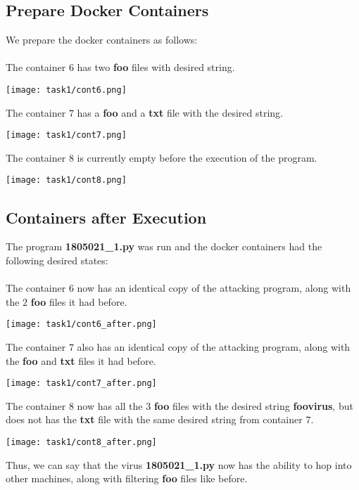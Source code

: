 \documentclass{article}
\begin{document}
\subsection{Prepare Docker Containers}
We prepare the docker containers as follows:\\\\
The container $6$ has two \textbf{foo} files with desired string.
\begin{center}
    \texttt{[image: task1/cont6.png]}
\end{center}
The container $7$ has a \textbf{foo} and a \textbf{txt} file with the desired string.
\begin{center}
    \texttt{[image: task1/cont7.png]}
\end{center}
The container $8$ is currently empty before the execution of the program.
\begin{center}
    \texttt{[image: task1/cont8.png]}
\end{center}


\subsection{Containers after Execution}
The program \textbf{1805021\_1.py} was run and the docker containers had the following desired states:\\\\

The container $6$ now has an identical copy of the attacking program, along with the $2$ \textbf{foo} files it had before. 
\begin{center}
    \texttt{[image: task1/cont6\_after.png]}
\end{center}

The container $7$ also has an identical copy of the attacking program, along with the \textbf{foo} and \textbf{txt} files it had before. 
\begin{center}
    \texttt{[image: task1/cont7\_after.png]}
\end{center}

The container $8$ now has all the $3$ \textbf{foo} files with the desired string \textbf{foovirus}, but does not has the \textbf{txt} file with the same desired string from container $7$.
\begin{center}
    \texttt{[image: task1/cont8\_after.png]}
\end{center}

Thus, we can say that the virus \textbf{1805021\_1.py} now has the ability to hop into other machines, along with filtering \textbf{foo} files like before.
\end{document}
